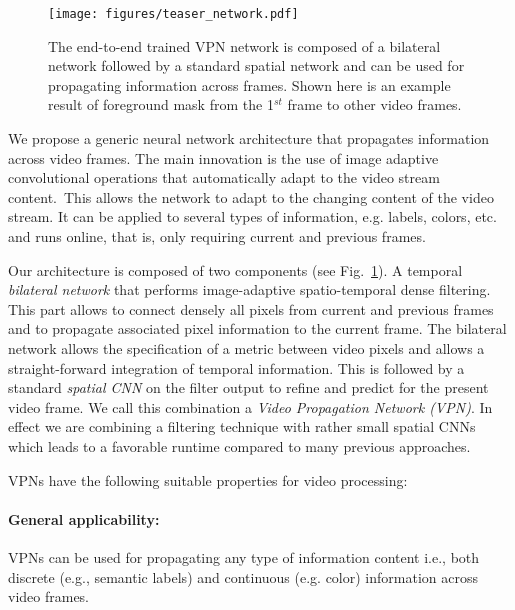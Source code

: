 \begin{figure}[t!]
\begin{center}
\centerline{\texttt{[image: figures/teaser\_network.pdf]}}
   {The end-to-end trained VPN network is composed
  of a bilateral network followed by a standard spatial network and can be used for
  propagating information across frames. Shown here is an example result
  of foreground mask from the 1$^{st}$ frame to other video frames.}
  \label{fig:illustration-vpn}
  \vspace{-0.3cm}
\end{center}
\end{figure}

We propose a generic neural network architecture that propagates information across
video frames. The main innovation is the use of image adaptive convolutional operations that automatically
adapt to
the video stream content.~This allows the network to adapt to the changing content of the video stream.
It can be applied to several types of information, e.g. labels, colors, etc. and runs online, that is, only requiring current and previous frames.

Our architecture is composed of two components (see Fig.~\ref{fig:illustration-vpn}).
A temporal \textit{bilateral network} that performs image-adaptive spatio-temporal dense filtering.
This part allows to connect densely all pixels from current and previous frames and to propagate associated pixel information to the current frame.
The bilateral network allows the specification of a metric between video pixels and allows a straight-forward integration of temporal information.
This is followed by a standard \textit{spatial CNN} on the filter output to refine and predict for the present video frame.
We call this combination a \textit{Video Propagation Network (VPN)}.
In effect we are combining a filtering technique with rather small spatial CNNs which leads to a favorable runtime compared to many previous approaches.

VPNs have the following suitable properties for video processing:

\vspace{-0.5cm}
\paragraph{General applicability:} VPNs can be used for propagating any
type of information content i.e., both discrete
(e.g., semantic labels) and continuous (e.g. color) information across video frames.
\vspace{-0.5cm}
